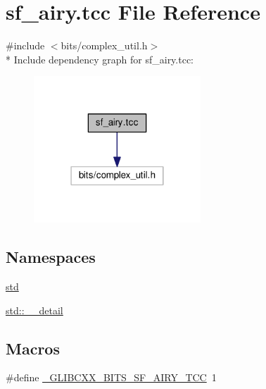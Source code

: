 \hypertarget{sf__airy_8tcc}{}\section{sf\+\_\+airy.\+tcc File Reference}
\label{sf__airy_8tcc}
{\ttfamily \#include $<$bits/complex\+\_\+util.\+h$>$}\\*
Include dependency graph for sf\+\_\+airy.\+tcc\+:
\nopagebreak
\begin{figure}[H]
\begin{center}
\leavevmode
\includegraphics[width=178pt]{sf__airy_8tcc__incl}
\end{center}
\end{figure}
\subsection*{Namespaces}
\begin{DoxyCompactItemize}
\item 
 \hyperlink{namespacestd}{std}
\item 
 \hyperlink{namespacestd_1_1____detail}{std\+::\+\_\+\+\_\+detail}
\end{DoxyCompactItemize}
\subsection*{Macros}
\begin{DoxyCompactItemize}
\item 
\#define \hyperlink{sf__airy_8tcc_a2368d5b1edfb2e14f2c283d87ab89943}{\+\_\+\+G\+L\+I\+B\+C\+X\+X\+\_\+\+B\+I\+T\+S\+\_\+\+S\+F\+\_\+\+A\+I\+R\+Y\+\_\+\+T\+C\+C}~1
\end{DoxyCompactItemize}
